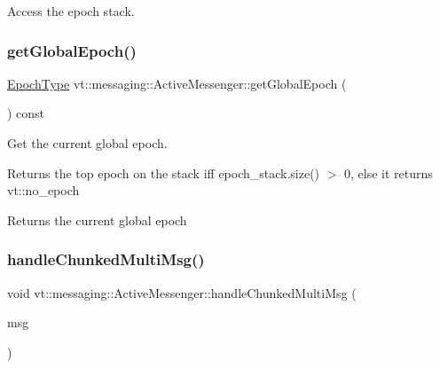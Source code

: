 Access the epoch stack. 

\mbox{\label{structvt_1_1messaging_1_1_active_messenger_abb892a84a906954d8769794ccfb0c638}} 
\subsubsection{\texorpdfstring{get\+Global\+Epoch()}{getGlobalEpoch()}}
{\footnotesize\ttfamily \hyperlink{namespacevt_a81d11b28122d43bf9834577e4a06440f}{Epoch\+Type} vt\+::messaging\+::\+Active\+Messenger\+::get\+Global\+Epoch (\begin{DoxyParamCaption}{ }\end{DoxyParamCaption}) const\hspace{0.3cm}{\ttfamily [inline]}}



Get the current global epoch. 

{\ttfamily Returns} the top epoch on the stack iff {\ttfamily epoch\+\_\+stack.\+size()} $>$ 0, else it returns {\ttfamily vt\+::no\+\_\+epoch} 

\begin{DoxyReturn}{Returns}
the current global epoch 
\end{DoxyReturn}
\mbox{\label{structvt_1_1messaging_1_1_active_messenger_a3ec09d3c055bee21bfd3d55a9c500b39}} 
\subsubsection{\texorpdfstring{handle\+Chunked\+Multi\+Msg()}{handleChunkedMultiMsg()}}
{\footnotesize\ttfamily void vt\+::messaging\+::\+Active\+Messenger\+::handle\+Chunked\+Multi\+Msg (\begin{DoxyParamCaption}\item[{\hyperlink{structvt_1_1messaging_1_1_multi_msg}{Multi\+Msg} $\ast$}]{msg }\end{DoxyParamCaption})\hspace{0.3cm}{\ttfamily [private]}}




